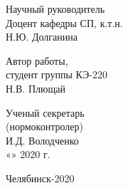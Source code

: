 \begin{titlepage}
    \hfill
    \begin{minipage}{0.4\textwidth}
        Научный руководитель\\
        Доцент кафедры СП, к.т.н.\\
        \underline{\hspace{2cm}} Н.Ю. Долганина\\
    \end{minipage}
    \bigskip
    \vfill

    \hfill
    \begin{minipage}{0.4\textwidth}
        Автор работы,\\
        студент группы КЭ-220\\
        \underline{\hspace{2cm}} Н.В. Плющай\\
    \end{minipage}
    \bigskip
    \vfill

    \hfill
    \begin{minipage}{0.4\textwidth}
        Ученый секретарь\\
        (нормоконтролер)\\
        \underline{\hspace{2cm}} И.Д. Володченко\\
        «\underline{\hspace{0.7cm}}» \underline{\hspace{2cm}} 2020 г.
    \end{minipage}
    \bigskip
    \vfill

    \begin{center}
        Челябинск-2020
    \end{center}
\end{titlepage}
